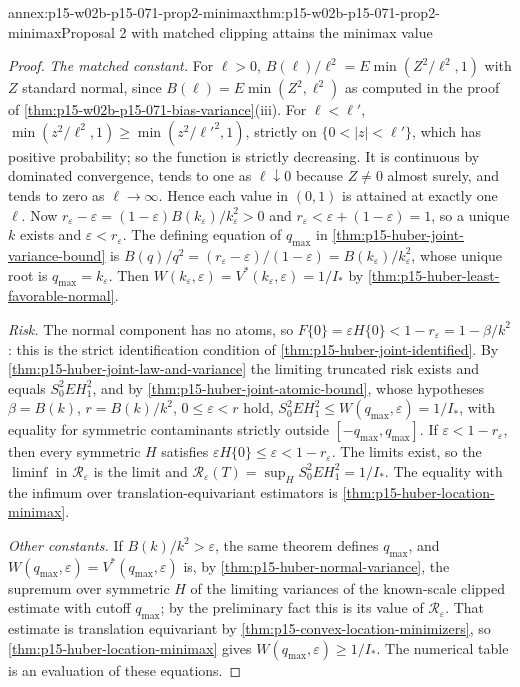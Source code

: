 \begin{annexitem}{annex:p15-w02b-p15-071-prop2-minimax}{thm:p15-w02b-p15-071-prop2-minimax}{Proposal 2 with matched clipping attains the minimax value}
\begin{proof}
\emph{The matched constant.} For \(\ell>0\),
\(B(\ell)/\ell^2=E\min(Z^2/\ell^2,1)\) with \(Z\) standard normal,
since \(B(\ell)=E\min(Z^2,\ell^2)\) as computed in the proof of
\cref{thm:p15-w02b-p15-071-bias-variance}(iii). For \(\ell<\ell'\),
\(\min(z^2/\ell^2,1)\geq\min(z^2/\ell'^2,1)\), strictly on
\(\{0<|z|<\ell'\}\), which has positive probability; so the function is
strictly decreasing. It is continuous by dominated convergence, tends to
one as \(\ell\downarrow0\) because \(Z\neq0\) almost surely, and tends to
zero as \(\ell\to\infty\). Hence each value in \((0,1)\) is attained at
exactly one \(\ell\). Now
\(r_\varepsilon-\varepsilon=(1-\varepsilon)B(k_\varepsilon)/k_\varepsilon^2>0\)
and \(r_\varepsilon<\varepsilon+(1-\varepsilon)=1\), so a unique \(k\)
exists and \(\varepsilon<r_\varepsilon\).
The defining equation of \(q_{\max}\) in
\cref{thm:p15-huber-joint-variance-bound} is
\(B(q)/q^2=(r_\varepsilon-\varepsilon)/(1-\varepsilon)
=B(k_\varepsilon)/k_\varepsilon^2\), whose unique root is
\(q_{\max}=k_\varepsilon\). Then
\(W(k_\varepsilon,\varepsilon)=V^*(k_\varepsilon,\varepsilon)=1/I_*\)
by \cref{thm:p15-huber-least-favorable-normal}.

\emph{Risk.} The normal component has no atoms, so
\(F\{0\}=\varepsilon H\{0\}<1-r_\varepsilon=1-\beta/k^2\): this is the
strict identification condition of \cref{thm:p15-huber-joint-identified}.
By \cref{thm:p15-huber-joint-law-and-variance} the limiting truncated
risk exists and equals \(S_0^2EH_1^2\), and by
\cref{thm:p15-huber-joint-atomic-bound}, whose hypotheses
\(\beta=B(k)\), \(r=B(k)/k^2\), \(0\leq\varepsilon<r\) hold,
\(S_0^2EH_1^2\leq W(q_{\max},\varepsilon)=1/I_*\), with equality for
symmetric contaminants strictly outside \([-q_{\max},q_{\max}]\).
If \(\varepsilon<1-r_\varepsilon\), then every symmetric \(H\) satisfies
\(\varepsilon H\{0\}\leq\varepsilon<1-r_\varepsilon\). The limits exist,
so the \(\liminf\) in \(\mathcal R_\varepsilon\) is the limit and
\(\mathcal R_\varepsilon(T)=\sup_H S_0^2EH_1^2=1/I_*\). The equality with
the infimum over translation-equivariant estimators is
\cref{thm:p15-huber-location-minimax}.

\emph{Other constants.} If \(B(k)/k^2>\varepsilon\), the same theorem
defines \(q_{\max}\), and \(W(q_{\max},\varepsilon)=V^*(q_{\max},\varepsilon)\)
is, by \cref{thm:p15-huber-normal-variance}, the supremum over symmetric
\(H\) of the limiting variances of the known-scale clipped estimate with
cutoff \(q_{\max}\); by the preliminary fact this is its value of
\(\mathcal R_\varepsilon\). That estimate is translation equivariant by
\cref{thm:p15-convex-location-minimizers}, so
\cref{thm:p15-huber-location-minimax} gives
\(W(q_{\max},\varepsilon)\geq1/I_*\).
The numerical table is an evaluation of these equations.
\end{proof}
\end{annexitem}

